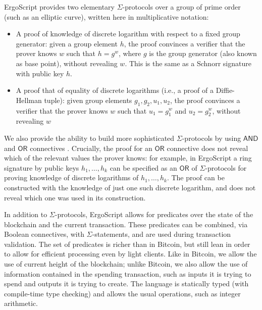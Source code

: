 \documentclass[11pt]{article}
\newcommand{\authnote}[2]{\marginpar{\parbox{\marginparwidth}{\tiny %
  \textsf{#1 {\textcolor{blue}{notes: #2}}}}}%
  \textcolor{blue}{\textbf{\dag}}}
\newcommand{\authnote}[2]{
  \textsf{#1 \textcolor{blue}{: #2}}}
\newcommand{\authnote}[2]{}
\newcommand{\lnote}[1]{{\authnote{\textcolor{orange}{Leo notes}}{#1}}}
\newcommand{\langname}{ErgoScript\xspace}
\newcommand{\andnode}{\ensuremath{\mathsf{AND}}}
\newcommand{\ornode}{\ensuremath{\mathsf{OR}}}
\newcommand{\tnode}{\ensuremath{\mathsf{THRESHOLD}}}
\begin{document}
\langname provides two elementary $\Sigma$-protocols over a group of prime order (such as an elliptic curve), written here in multiplicative notation:
\begin{itemize}
\item A proof of knowledge of discrete logarithm with respect to a fixed group generator: given a group element $h$, the proof convinces a verifier that the prover knows $w$ such that $h=g^w$, where $g$ is the group generator (also known as base point), without revealing $w$. This is the same as a Schnorr signature with public key $h$.
\item A proof that of equality of discrete logarithms (i.e., a proof of a Diffie-Hellman tuple): given group elements $g_1, g_2, u_1, u_2$, the proof convinces a verifier that the prover knows $w$ such that $u_1=g_1^w$ and $u_2=g_2^w$, without revealing $w$
\end{itemize}
\lnote{This is not the notation used in the code, but in the code, $g$ is overloaded verloaded because it's the base point in item 1 and an arbitrary point in item 2; $h$ is also overloaded. Perhaps we should change the code to better notation and then make this text match it.}


We also provide the ability to build more sophisticated $\Sigma$-protocols by using $\andnode$ and $\ornode$ connectives 
\lnote{add $\tnode$ when we implement it}. 
Crucially, the proof for an $\ornode$ connective does not reveal which of the relevant values the prover knows: for example, in \langname a ring signature by public keys $h_1, \dots, h_k$ can be specified as an $\ornode$ of $\Sigma$-protocols for proving knowledge of discrete logarithms of $h_1, \dots, h_k$. The proof can be constructed with the knowledge of just one such discrete logarithm, and does not reveal which one was used in its construction. 

In addition to $\Sigma$-protocols, \langname allows for predicates over the state of the blockchain and the current transaction. These predicates can be combined, via Boolean connectives, with $\Sigma$-statements, and are used during transaction validation. The set of predicates is richer than in Bitcoin, but still lean in order to allow for efficient processing even by light clients. Like in Bitcoin, we allow the use of current height of the blockchain; unlike Bitcoin, we also allow the use of information contained in the spending transaction, such as inputs it is trying to spend and outputs it is trying to create.
The language is statically typed (with compile-time type checking) and allows the usual operations, such as integer arithmetic.
\end{document}
